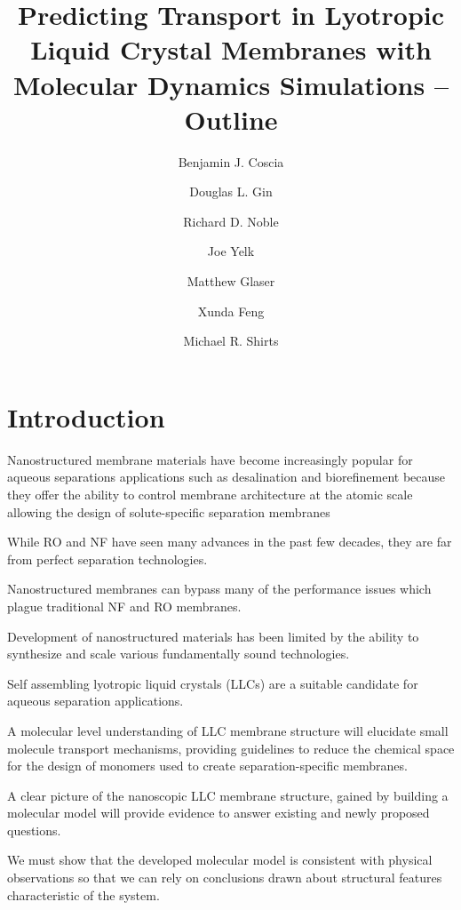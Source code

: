 \documentclass{article}
\title{Predicting Transport in Lyotropic Liquid Crystal Membranes with Molecular Dynamics Simulations -- Outline}
\author{Benjamin J. Coscia \and Douglas L. Gin \and Richard D. Noble \and Joe Yelk \and Matthew Glaser \and Xunda Feng \and Michael R. Shirts}
\begin{document}
  
  \graphicspath{{./figures/}}
  \maketitle
  \section*{Introduction}
  
  Nanostructured membrane materials have become increasingly popular for 
  aqueous separations applications such as desalination and biorefinement
  because they offer the ability to control membrane architecture at the
  atomic scale allowing the design of solute-specific separation membranes
  
  While RO and NF have seen many advances in the past few decades, they 
  are far from perfect separation technologies.
  
  Nanostructured membranes can bypass many of the performance issues which
  plague traditional NF and RO membranes.
  
  Development of nanostructured materials has been limited by the ability
  to synthesize and scale various fundamentally sound technologies.
  
  Self assembling lyotropic liquid crystals (LLCs) are a suitable candidate
  for aqueous separation applications.
  
  A molecular level understanding of LLC membrane structure will elucidate
  small molecule transport mechanisms, providing guidelines to reduce the
  chemical space for the design of monomers used to create separation-specific
  membranes.
  
  A clear picture of the nanoscopic LLC membrane structure, gained by building 
  a molecular model will provide evidence to answer existing and newly proposed
  questions.
  
  We must show that the developed molecular model is consistent with
  physical observations so that we can rely on conclusions drawn about %
  structural features characteristic of the system.
\end{document}
